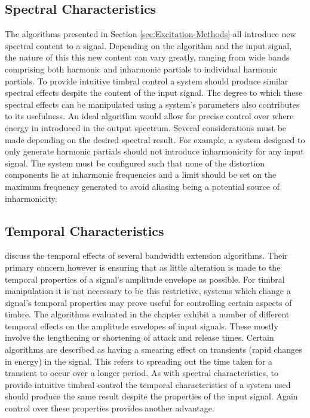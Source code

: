 	\subsection{Spectral Characteristics}
	\label{sec:ExcitationEvaluation-Evaluation-SpectralCharacteristics}
		The algorithms presented in Section \ref{sec:Excitation-Methods} all introduce new spectral content to a
		signal. Depending on the algorithm and the input signal, the nature of this this new content can vary
		greatly, ranging from wide bands comprising both harmonic and inharmonic partials to individual harmonic
		partials. To provide intuitive timbral control a system should produce similar spectral effects despite the
		content of the input signal. The degree to which these spectral effects can be manipulated using a system's
		parameters also contributes to its usefulness. An ideal algorithm would allow for precise control over
		where energy in introduced in the output spectrum. Several considerations must be made depending on the
		desired spectral result. For example, a system designed to only generate harmonic partials should not
		introduce inharmonicity for any input signal. The system must be configured such that none of the
		distortion components lie at inharmonic frequencies and a limit should be set on the maximum frequency
		generated to avoid aliasing being a potential source of inharmonicity.

	\subsection{Temporal Characteristics}
	\label{sec:ExcitationEvaluation-Evaluation-TemporalCharacteristics}		
		\citet{larsen2004audio} discuss the temporal effects of several bandwidth extension algorithms. Their
		primary concern however is ensuring that as little alteration is made to the temporal properties of a
		signal's amplitude envelope as possible. For timbral manipulation it is not necessary to be this
		restrictive, systems which change a signal's temporal properties may prove useful for controlling certain
		aspects of timbre. The algorithms evaluated in the chapter exhibit a number of different temporal effects
		on the amplitude envelopes of input signals. These mostly involve the lengthening or shortening of attack
		and release times.  Certain algorithms are described as having a smearing effect on transients (rapid
		changes in energy) in the signal. This refers to spreading out the time taken for a transient to occur over
		a longer period. As with spectral characteristics, to provide intuitive timbral control the temporal
		characteristics of a system used should produce the same result despite the properties of the input signal.
		Again control over these properties provides another advantage.

